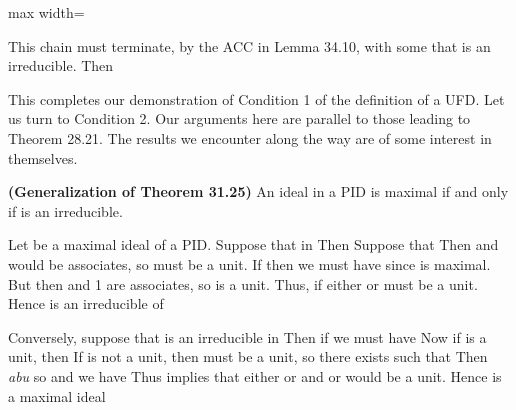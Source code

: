 \documentclass[11pt,oneside]{article}
\begin{document}
\begin{BookBody}
\begin{center}\begin{adjustbox}{max width=\linewidth}\end{adjustbox}\end{center}

\noindent This chain must terminate, by the ACC in Lemma 34.10, with some  that is an irreducible. Then \BookEnd{\blacklozenge}

This completes our demonstration of Condition 1 of the definition of a UFD. Let us turn to Condition 2. Our arguments here are parallel to those leading to Theorem 28.21. The results we encounter along the way are of some interest in themselves.

 \textbf{(Generalization of Theorem 31.25)} An ideal  in a PID is maximal if and only if  is an irreducible.

 Let  be a maximal ideal of  a PID. Suppose that  in  Then  Suppose that  Then  and  would be associates, so  must be a unit. If   then we must have  since  is maximal. But then  and 1 are associates, so  is a unit. Thus, if  either  or  must be a unit. Hence  is an irreducible of 

Conversely, suppose that  is an irreducible in  Then if  we must have  Now if  is a unit, then  If  is not a unit, then  must be a unit, so there exists  such that  Then  \textit{abu}  so  and we have  Thus  implies that either  or  and  or  would be a unit. Hence  is a maximal ideal\BookEnd{\blacklozenge}


\end{BookBody}
\end{document}
